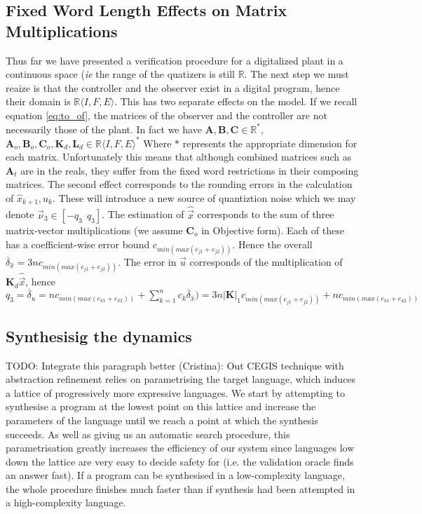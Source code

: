 \documentclass[runningheads,a4paper]{llncs}
\newcommand{\todo}[1]{{\color{red} TODO: #1}}
\newcommand{\mat}[1]{\boldsymbol{#1}}
\begin{document}
\subsection{Fixed Word Length Effects on Matrix Multiplications}\label{sec:cof_fwl}
Thus far we have presented a verification procedure for a digitalized plant in a continuous space (\emph{ie} the
range of the quatizers is still $\mathbb{R}$. The next step we must reaize is that the controller and the observer
exist in a digital program, hence their domain is $\mathbb{R}\langle I,F,E\rangle$. This has two separate effects
on the model. If we recall equation \eqref{eq:to_of}, the matrices of the observer and the controller  are not necessarily those of the plant.
In fact we have $\mat{A},\mat{B},\mat{C} \in \mathbb{R}^*$, $\mat{A}_o,\mat{B}_o,\mat{C}_o, \mat{K}_d, \mat{L}_d \in \mathbb{R}\langle I,F,E\rangle^*$
Where $*$ represents the appropriate dimension for each matrix.
Unfortunately this means that although combined matrices such as $\mat{A}_t$ are in the reals, they suffer from
the fixed word restrictions in their composing matrices.
The second effect corresponds to the rounding errors in the calculation of $\hat{x}_{k+1}, u_k$. These will introduce a new source of quantiztion noise which we may denote $\vec{\nu}_3 \in [-q_3\ \ q_3]$.
The estimation of $\hat{\vec{x}}$ corresponds to the sum of three matrix-vector multiplications (we assume $\mat{C}_o$ in Objective form). Each of these has a coefficient-wise error bound $c_{min(max(e_{j1}+e_{j2}))}$. Hence the overall $\overline{\delta}_{\hat{x}}=3nc_{min(max(e_{j1}+e_{j2}))}$. The error in $\vec{u}$ corresponds of the multiplication of $\mat{K}_d\hat{\vec{x}}$, hence $q_3=\overline{\delta}_u=nc_{min(max(e_{k1}+e_{k2}))}+\sum_{k=1}^nc_k\overline{\delta}_{\hat{x}})=3n|\mat{K}|_1c_{min(max(e_{j1}+e_{j2}))}+nc_{min(max(e_{k1}+e_{k2}))}$

\subsection{Synthesisig the dynamics}\label{sec:cof_synth}
\todo{Integrate this paragraph better (Cristina):}
Out CEGIS technique with abstraction refinement
relies on parametrising the target language, which
induces a lattice of progressively more expressive languages.  We
start by attempting to synthesise a program at the lowest point on
this lattice and increase the parameters of the language until we
reach a point at which the synthesis succeeds. As well as giving us an
automatic search procedure, this parametrisation greatly increases the
efficiency of our system since languages low down the lattice are very
easy to decide safety for (i.e. the validation oracle finds an answer
fast). If a program can be synthesised in a low-complexity language,
the whole procedure finishes much faster than if synthesis had been
attempted in a high-complexity language.
\end{document}
